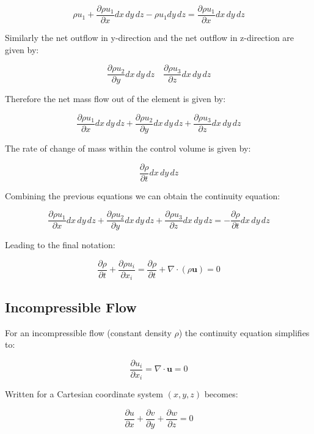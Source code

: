\documentclass{article}
\begin{document}
\[
\rho u_1 + \frac{\partial \rho u_1}{\partial x} dx \, dy \, dz - \rho u_1 dy \, dz = \frac{\partial \rho u_1}{\partial x} dx \, dy \, dz
\]

Similarly the net outflow in y-direction and the net outflow in z-direction are given by:

\[
\frac{\partial \rho u_2}{\partial y} dx \, dy \, dz \quad \frac{\partial \rho u_3}{\partial z} dx \, dy \, dz
\]

Therefore the net mass flow out of the element is given by:

\begin{equation}
\frac{\partial \rho u_1}{\partial x} dx \, dy \, dz + \frac{\partial \rho u_2}{\partial y} dx \, dy \, dz + \frac{\partial \rho u_3}{\partial z} dx \, dy \, dz
\end{equation}

The rate of change of mass within the control volume is given by:

\begin{equation}
\frac{\partial \rho}{\partial t} dx \, dy \, dz
\end{equation}

Combining the previous equations we can obtain the continuity equation:

\[
\frac{\partial \rho u_1}{\partial x} dx \, dy \, dz + \frac{\partial \rho u_2}{\partial y} dx \, dy \, dz + \frac{\partial \rho u_3}{\partial z} dx \, dy \, dz = - \frac{\partial \rho}{\partial t} dx \, dy \, dz
\]

Leading to the final notation:

\begin{equation}
\frac{\partial \rho}{\partial t} + \frac{\partial \rho u_i}{\partial x_i} = \frac{\partial \rho}{\partial t} + \nabla \cdot (\rho \mathbf{u}) = 0
\end{equation}

\subsection{Incompressible Flow}
For an incompressible flow (constant density $\rho$) the continuity equation simplifies to:

\begin{equation}
\frac{\partial u_i}{\partial x_i} = \nabla \cdot \mathbf{u} = 0
\end{equation}

Written for a Cartesian coordinate system $(x, y, z)$ becomes:

\[
\frac{\partial u}{\partial x} + \frac{\partial v}{\partial y} + \frac{\partial w}{\partial z} = 0
\]
\end{document}
